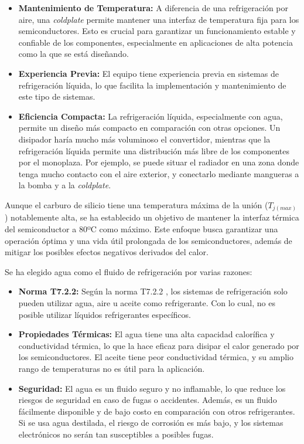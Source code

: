\begin{itemize}
	\item \textbf{Mantenimiento de Temperatura:} A diferencia de una refrigeración por aire, una \textit{coldplate} permite mantener una interfaz de temperatura fija para los semiconductores. Esto es crucial para garantizar un funcionamiento estable y confiable de los componentes, especialmente en aplicaciones de alta potencia como la que se está diseñando.
	
	\item \textbf{Experiencia Previa:} El equipo tiene experiencia previa en sistemas de refrigeración líquida, lo que facilita la implementación y mantenimiento de este tipo de sistemas.
	
	\item \textbf{Eficiencia Compacta:} La refrigeración líquida, especialmente con agua, permite un diseño más compacto en comparación con otras opciones. Un disipador haría mucho más voluminoso el convertidor, mientras que la refrigeración líquida permite una distribución más libre de los componentes por el monoplaza. Por ejemplo, se puede situar el radiador en una zona donde tenga mucho contacto con el aire exterior, y conectarlo mediante mangueras a la bomba y a la \textit{coldplate}.
	
	
\end{itemize}

Aunque el carburo de silicio tiene una temperatura máxima de la unión (\(T_{j(max)}\)) notablemente alta, se ha establecido un objetivo de mantener la interfaz térmica del semiconductor a 80ºC como máximo. Este enfoque busca garantizar una operación óptima y una vida útil prolongada de los semiconductores, además de mitigar los posibles efectos negativos derivados del calor.

Se ha elegido agua como el fluido de refrigeración por varias razones:

\begin{itemize}
	\item \textbf{Norma T7.2.2:} Según la norma T7.2.2 \cite{FSG}, los sistemas de refrigeración solo pueden utilizar agua, aire u aceite como refrigerante. Con lo cual, no es posible utilizar líquidos refrigerantes específicos.
	
	\item \textbf{Propiedades Térmicas:} El agua tiene una alta capacidad calorífica y conductividad térmica, lo que la hace eficaz para disipar el calor generado por los semiconductores. El aceite tiene peor conductividad térmica, y su amplio rango de temperaturas no es útil para la aplicación.
	
	\item \textbf{Seguridad:} El agua es un fluido seguro y no inflamable, lo que reduce los riesgos de seguridad en caso de fugas o accidentes. Además, es un fluido fácilmente disponible y de bajo costo en comparación con otros refrigerantes. Si se usa agua destilada, el riesgo de corrosión es más bajo, y los sistemas electrónicos no serán tan susceptibles a posibles fugas.
	
\end{itemize}

